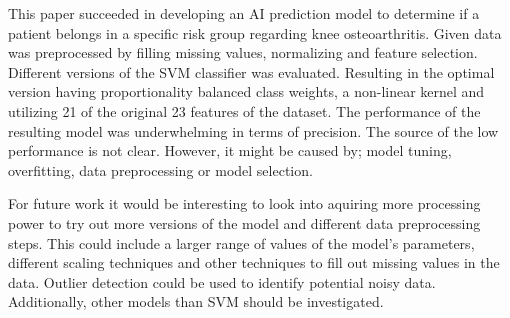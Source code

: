 This paper succeeded in developing an AI prediction model to determine if a patient belongs in a specific risk group regarding knee osteoarthritis. Given data was preprocessed by filling missing values, normalizing and feature selection. Different versions of the SVM classifier was evaluated. Resulting in the optimal version having proportionality balanced class weights, a non-linear kernel and utilizing 21 of the original 23 features of the dataset. The performance of the resulting model was underwhelming in terms of precision. The source of the low performance is not clear. However, it might be caused by; model tuning, overfitting, data preprocessing or model selection. 

For future work it would be interesting to look into aquiring more processing power to try out more versions of the model and different data preprocessing steps. This could include a larger range of values of the model's parameters, different scaling techniques and other techniques to fill out missing values in the data. Outlier detection could be used to identify potential noisy data. Additionally, other models than SVM should be investigated.              



